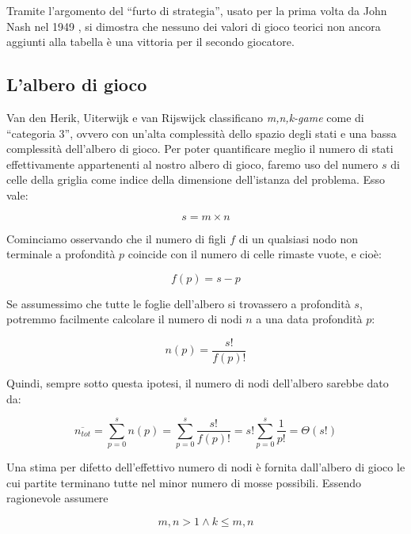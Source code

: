 \documentclass{article}
\begin{document}
Tramite l'argomento del ``furto di strategia'', usato per la prima volta da John
Nash nel 1949 \cite{at.UBO716493520180101}, si dimostra che nessuno dei valori
di gioco teorici non ancora aggiunti alla tabella è una vittoria per il secondo
giocatore.

\subsection{L'albero di gioco}

Van den Herik, Uiterwijk e van Rijswijck \cite{VANDENHERIK2002277} classificano
\emph{m,n,k-game} come di ``categoria 3'', ovvero con un'alta complessità dello
spazio degli stati e una bassa complessità dell'albero di gioco. Per poter
quantificare meglio il numero di stati effettivamente appartenenti al nostro
albero di gioco, faremo uso del numero $s$ di celle della griglia come indice
della dimensione dell'istanza del problema. Esso vale:

\begin{equation}
s = m \times n
\end{equation}

Cominciamo osservando che il numero di figli $f$ di un qualsiasi nodo non
terminale a profondità $p$ coincide con il numero di celle rimaste vuote, e
cioè:

\begin{equation}
  f(p) = s - p
\end{equation}

Se assumessimo che tutte le foglie dell'albero si trovassero a profondità $s$,
potremmo facilmente calcolare il numero di nodi $n$ a una data profondità $p$:

\begin{equation}
  n(p) = \frac{s!}{f(p)!}
\end{equation}

Quindi, sempre sotto questa ipotesi, il numero di nodi dell'albero sarebbe dato
da:

\begin{equation}
 \overline{n_{tot}} = \sum_{p = 0}^{s} n(p) = \sum_{p = 0}^{s} \frac{s!}{f(p)!}
  = s! \sum_{p = 0}^{s} \frac{1}{p!} = \varTheta(s!)
\end{equation}

Una stima per difetto dell'effettivo numero di nodi è fornita dall'albero di
gioco le cui partite terminano tutte nel minor numero di mosse possibili.
Essendo ragionevole assumere

\begin{equation}
  m, n > 1 \wedge k \leq m, n
\end{equation}
\end{document}
